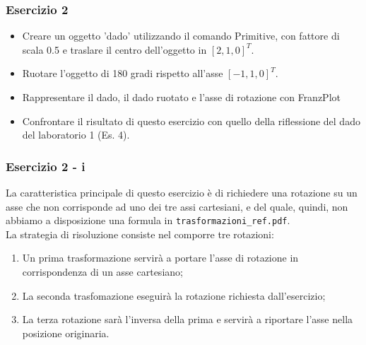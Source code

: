 \documentclass{beamer}
\newcommand{\frnzplt}{FranzPlot }
\begin{document}
\begin{frame}
\frametitle {Esercizio 2}
\begin{itemize}
\item Creare un oggetto 'dado' utilizzando il comando Primitive, con fattore di
scala 0.5 e traslare il centro dell'oggetto in   $[ 2,1,0]^T$. 
\item Ruotare l'oggetto di 180 gradi rispetto all'asse $[ -1,1,0 ]^T$.
\item Rappresentare il dado, il dado ruotato e l'asse di rotazione con \frnzplt
\item Confrontare il risultato di questo esercizio con quello della riflessione del dado del laboratorio 1 (Es. 4).

\end{itemize}
\end{frame}
\begin{frame}
\frametitle{ Esercizio 2 - i}
La caratteristica principale di questo esercizio \`e di richiedere una
rotazione su un asse che non corrisponde ad uno dei tre assi cartesiani, e del
quale, quindi, non abbiamo a disposizione una formula in
\texttt{trasformazioni\_ref.pdf}.\\ 
La strategia di risoluzione consiste nel
comporre tre rotazioni:
\begin{enumerate}
\item Un prima trasformazione servir\`a a portare l'asse di rotazione in corrispondenza di un asse cartesiano;
\item La seconda trasfomazione eseguir\`a la rotazione richiesta dall'esercizio;
\item La terza rotazione sar\`a l'inversa della prima e servir\`a a riportare l'asse nella posizione originaria.
\end{enumerate}
\end{frame}
\end{document}
